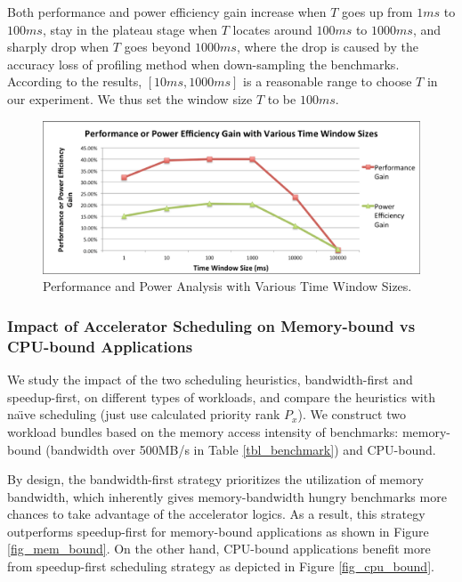 Both performance and power efficiency gain increase when $T$ goes up
from $1 ms$ to $100 ms$, stay in the plateau stage when $T$ locates
around $100 ms$ to $1000 ms$, and sharply drop when $T$ goes beyond
$1000 ms$, where the drop is caused by the accuracy loss of profiling
method when down-sampling the benchmarks. According to the results,
$[10 ms, 1000 ms]$ is a reasonable range to choose $T$ in our
experiment. We thus set the window size $T$ to be $100 ms$.

\begin{figure}
    \centering
    \includegraphics[width=4.5in]{Time-Window-Size}
    \caption{Performance and Power Analysis with Various Time Window Sizes.}
    \label{fig_time_window}
\end{figure}

\subsubsection{Impact of Accelerator Scheduling on Memory-bound vs
  CPU-bound Applications}

We study the impact of the two scheduling heuristics, bandwidth-first
and speedup-first, on different types of workloads, and compare the
heuristics with na\"{\i}ve scheduling (just use calculated priority
rank $P_x$).  We construct two workload bundles based on the memory
access intensity of benchmarks: memory-bound (bandwidth over 500MB/s
in Table \ref{tbl_benchmark}) and CPU-bound.

By design, the
bandwidth-first strategy prioritizes the utilization of memory
bandwidth, which inherently gives memory-bandwidth hungry benchmarks
more chances to take advantage of the accelerator logics. As a result,
this strategy outperforms speedup-first for memory-bound
applications as shown in Figure \ref{fig_mem_bound}. On the other hand,
CPU-bound applications benefit more from speedup-first
scheduling strategy as depicted in Figure \ref{fig_cpu_bound}.

